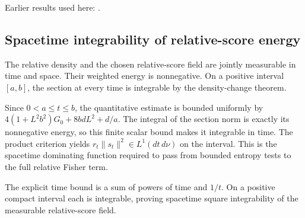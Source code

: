 \documentclass[11pt,a4paper]{report}
\begin{document}
Earlier results used here: \cite[Section~3.26.3]{LangevinLean2026ULASC}.
\subsection{\texorpdfstring{Spacetime integrability of relative-score energy}{Spacetime integrability of relative-score energy}}
\label{report-step-UnadjustedLangevin-LSI-GaussianEnergyIntegrability-lean-5}


The relative density and the chosen relative-score field are jointly measurable in time and space. Their weighted energy is nonnegative. On a positive interval \([a,b]\), the section at every time is integrable by the density-change theorem.



Since \(0<a\le t\le b\), the quantitative estimate is bounded uniformly by \(4(1+L^2b^2)G_0+8bdL^2+d/a\). The integral of the section norm is exactly its nonnegative energy, so this finite scalar bound makes it integrable in time. The product criterion yields \(r_t\|s_t\|^2\in L^1(dt\,d\nu)\) on the interval. This is the spacetime dominating function required to pass from bounded entropy tests to the full relative Fisher term.



The explicit time bound is a sum of powers of time and \(1/t\). On a positive compact interval each is integrable, proving spacetime square integrability of the measurable relative-score field.
\end{document}
